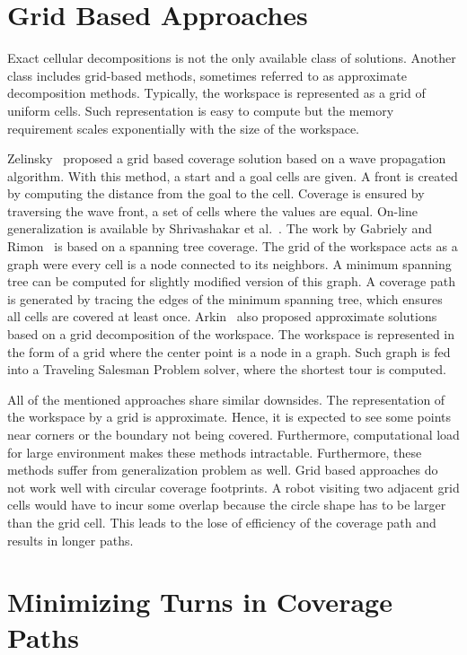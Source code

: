 \documentclass[../main.tex]{subfiles}
\begin{document}
\section{Grid Based Approaches}
\label{section:grid_based_approaches}

Exact cellular decompositions is not the only available class of solutions. Another class includes grid-based methods, sometimes referred to as approximate decomposition methods. Typically, the workspace is represented as a grid of uniform cells. Such representation is easy to compute but the memory requirement scales exponentially with the size of the workspace.

Zelinsky~\cite{Zelinsky1993planning} proposed a grid based coverage solution based on a wave propagation algorithm. With this method, a start and a goal cells are given. A front is created by computing the distance from the goal to the cell. Coverage is ensured by traversing the wave front, a set of cells where the values are equal. On-line generalization is available by Shrivashakar et al.~\cite{shivashankar2011real}. The work by Gabriely and Rimon~\cite{Gabriely2001spanning} is based on a spanning tree coverage. The grid of the workspace acts as a graph were every cell is a node connected to its neighbors. A minimum spanning tree can be computed for slightly modified version of this graph. A coverage path is generated by tracing the edges of the minimum spanning tree, which ensures all cells are covered at least once. Arkin~\cite{arkin2000approximation} also proposed approximate solutions based on a grid decomposition of the workspace. The workspace is represented in the form of a grid where the center point is a node in a graph. Such graph is fed into a Traveling Salesman Problem solver, where the shortest tour is computed.

All of the mentioned approaches share similar downsides. The representation of the workspace by a grid is approximate. Hence, it is expected to see some points near corners or the boundary not being covered. Furthermore, computational load for large environment makes these methods intractable. Furthermore, these methods suffer from generalization problem as well. Grid based approaches do not work well with circular coverage footprints. A robot visiting two adjacent grid cells would have to incur some overlap because the circle shape has to be larger than the grid cell. This leads to the lose of efficiency of the coverage path and results in longer paths.


\section{Minimizing Turns in Coverage Paths}
\label{section:minimizing_turns_in_coverage_paths}
\end{document}

